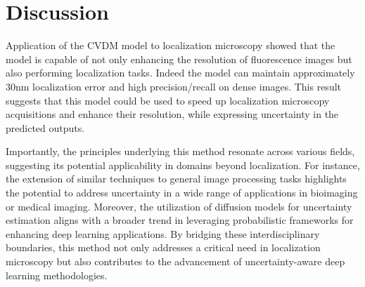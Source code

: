 

\section{Discussion}

Application of the CVDM model to localization microscopy showed that the model is capable of not only enhancing the resolution of fluorescence images but also performing localization tasks. Indeed the model can maintain approximately 30nm localization error and high precision/recall on dense images. This result suggests that this model could be used to speed up localization microscopy acquisitions and enhance their resolution, while expressing uncertainty in the predicted outputs. 

Importantly, the principles underlying this method resonate across various fields, suggesting its potential applicability in domains beyond localization. For instance, the extension of similar techniques to general image processing tasks highlights the potential to address uncertainty in a wide range of applications in bioimaging or medical imaging. Moreover, the utilization of diffusion models for uncertainty estimation aligns with a broader trend in leveraging probabilistic frameworks for enhancing deep learning applications. By bridging these interdisciplinary boundaries, this method not only addresses a critical need in localization microscopy but also contributes to the advancement of uncertainty-aware deep learning methodologies.


